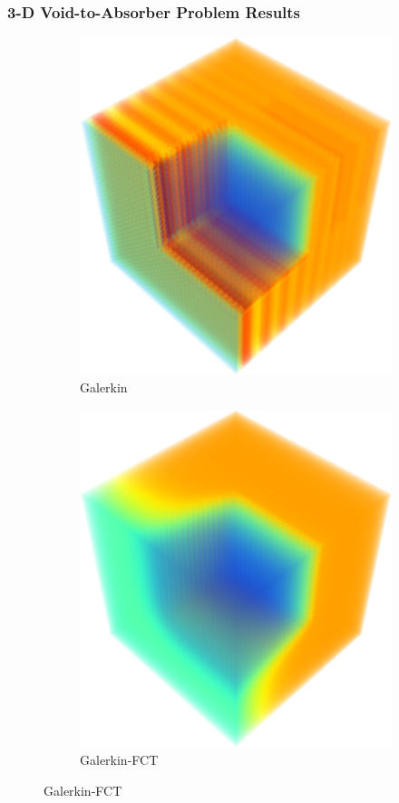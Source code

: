 \documentclass{beamer} \useoutertheme{infolines}
\begin{document}
\begin{frame}
\frametitle{3-D Void-to-Absorber Problem Results}

\begin{figure}[h]
   \centering
   \begin{subfigure}{0.45\textwidth}
      \includegraphics[width=\textwidth]{./figures/Gal_3D.png}
      \caption{Galerkin}
   \end{subfigure}
   \begin{subfigure}{0.45\textwidth}
      \includegraphics[width=\textwidth]{./figures/GalFCT_3D.png}
      \caption{Galerkin-FCT}
   \end{subfigure}
\end{figure}


\end{frame}
\end{document}
